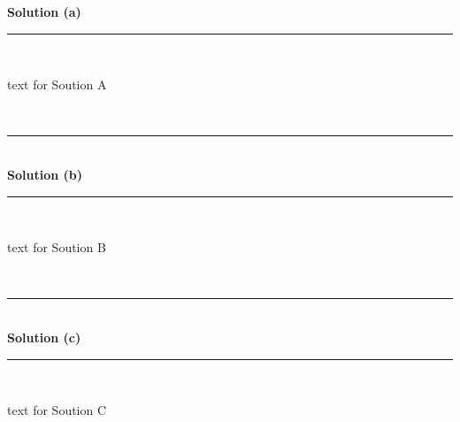 \documentclass{article}
\begin{document}
\textbf{Solution (a)}

\noindent\rule{\textwidth}{0.4pt}\\

\parbox{\textwidth}{text for Soution A}\\

\noindent\rule{\textwidth}{0.4pt}\\

\textbf{Solution (b)}

\noindent\rule{\textwidth}{0.4pt}\\

\parbox{\textwidth}{text for Soution B}\\

\noindent\rule{\textwidth}{0.4pt}\\

\textbf{Solution (c)}

\noindent\rule{\textwidth}{0.4pt}\\

\parbox{\textwidth}{text for Soution C}
\end{document}
